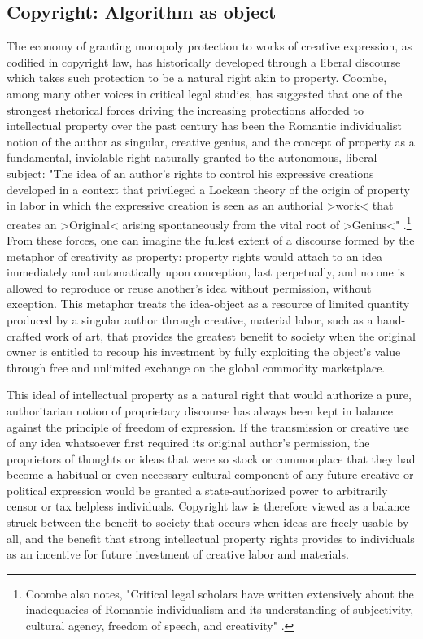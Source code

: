 \subsection*{Copyright: Algorithm as object}
The economy of granting monopoly protection to works of creative expression, as codified in copyright law, has historically developed through a liberal discourse which takes such protection to be a natural right akin to property. Coombe, among many other voices in critical legal studies, has suggested that one of the strongest rhetorical forces driving the increasing protections afforded to intellectual property over the past century has been the Romantic individualist notion of the author as singular, creative genius, and the concept of property as a fundamental, inviolable right naturally granted to the autonomous, liberal subject: "The idea of an author's rights to control his expressive creations developed in a context that privileged a Lockean theory of the origin of property in labor in which the expressive creation is seen as an authorial >work< that creates an >Original< arising spontaneously from the vital root of >Genius<" \autocite*[219]{Coombe1998-yv}.\footnote{
  Coombe also notes, "Critical legal scholars have written extensively about the inadequacies of Romantic individualism and its understanding of subjectivity, cultural agency, freedom of speech, and creativity" \autocite*[212]{Coombe1998-yv}.
}
From these forces, one can imagine the fullest extent of a discourse formed by the metaphor of creativity as property: property rights would attach to an idea immediately and automatically upon conception, last perpetually, and no one is allowed to reproduce or reuse another's idea without permission, without exception. This metaphor treats the idea-object as a resource of limited quantity produced by a singular author through creative, material labor, such as a hand-crafted work of art, that provides the greatest benefit to society when the original owner is entitled to recoup his investment by fully exploiting the object's value through free and unlimited exchange on the global commodity marketplace. 

This ideal of intellectual property as a natural right that would authorize a pure, authoritarian notion of proprietary discourse has always been kept in balance against the principle of freedom of expression. If the transmission or creative use of any idea whatsoever first required its original author's permission, the proprietors of thoughts or ideas that were so stock or commonplace that they had become a habitual or even necessary cultural component of any future creative or political expression would be granted a state-authorized power to arbitrarily censor or tax helpless individuals. Copyright law is therefore viewed as a balance struck between the benefit to society that occurs when ideas are freely usable by all, and the benefit that strong intellectual property rights provides to individuals as an incentive for future investment of creative labor and materials.

